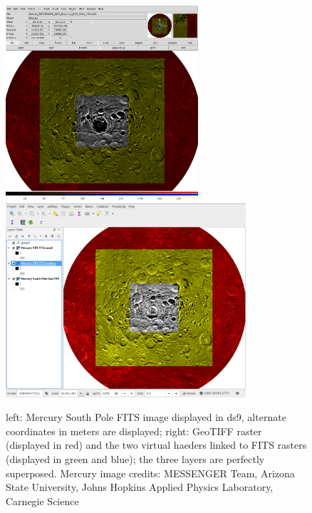 \begin{figure}[ht!]
\centerline{\includegraphics[height=17pc]{ess_marmo2} \includegraphics[height=17pc]{ess_marmo1}}
\caption{left: Mercury South Pole FITS image displayed in ds9, alternate coordinates in meters
are displayed;
right: GeoTIFF raster (displayed in red) and the two virtual haeders
linked to FITS rasters (displayed in green and blue); the three layers
are perfectly superposed.
Mercury image credits: MESSENGER Team, Arizona State University, Johns Hopkins Applied
Physics Laboratory, Carnegie Science}
\label{fig:ds9qgis}
\end{figure}

